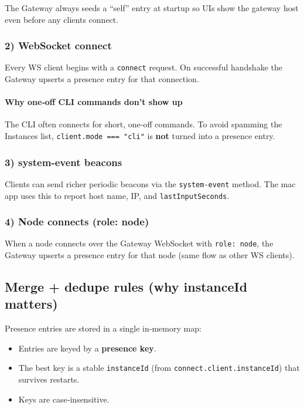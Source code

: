 The Gateway always seeds a “self” entry at startup so UIs show the gateway host
even before any clients connect.

\subsubsection{2) WebSocket connect}


Every WS client begins with a \texttt{connect} request. On successful handshake the
Gateway upserts a presence entry for that connection.

\paragraph{Why one‑off CLI commands don’t show up}


The CLI often connects for short, one‑off commands. To avoid spamming the
Instances list, \texttt{client.mode === "cli"} is \textbf{not} turned into a presence entry.

\subsubsection{3) system-event beacons}


Clients can send richer periodic beacons via the \texttt{system-event} method. The mac
app uses this to report host name, IP, and \texttt{lastInputSeconds}.

\subsubsection{4) Node connects (role: node)}


When a node connects over the Gateway WebSocket with \texttt{role: node}, the Gateway
upserts a presence entry for that node (same flow as other WS clients).

\subsection{Merge + dedupe rules (why instanceId matters)}


Presence entries are stored in a single in‑memory map:

\begin{itemize}
  \item Entries are keyed by a \textbf{presence key}.
  \item The best key is a stable \texttt{instanceId} (from \texttt{connect.client.instanceId}) that survives restarts.
  \item Keys are case‑insensitive.
\end{itemize}


